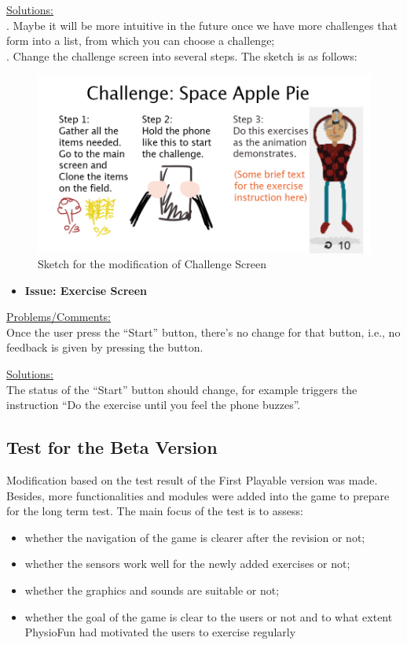 \documentclass{article}
\begin{document}
\underline{Solutions:} \\. Maybe it will be more intuitive in the future once we have more challenges that form into a list, from which you can choose a challenge;\\
. Change the challenge screen into several steps. The sketch is as follows:
\begin{figure}[H]
  \centering
  \includegraphics[width=0.6\linewidth]{challengeModify.jpg}
  \caption{Sketch for the modification of Challenge Screen}
\end{figure}

\begin{itemize}
    \item{\textbf{Issue: Exercise Screen}}
\end{itemize}

\underline{Problems/Comments:} \\\indent Once the user press the “Start” button, there’s no change for that button, i.e., no feedback is given by pressing the button.

\underline{Solutions:} \\\indent The status of the “Start” button should change, for example triggers the instruction “Do the exercise until you feel the phone buzzes”.




\subsection{Test for the Beta Version}
Modification based on the test result of the First Playable version was made. Besides, more functionalities and modules were added into the game to prepare for the long term test. The main focus of the test is to assess:
\begin{itemize}
    \item{whether the navigation of the game is clearer after the revision or not;}
    \item{whether the sensors work well for the newly added exercises or not;}
    \item{whether the graphics and sounds are suitable or not;}
    \item{whether the goal of the game is clear to the users or not and to what extent PhysioFun had motivated the users to exercise regularly}
\end{itemize}
\end{document}
